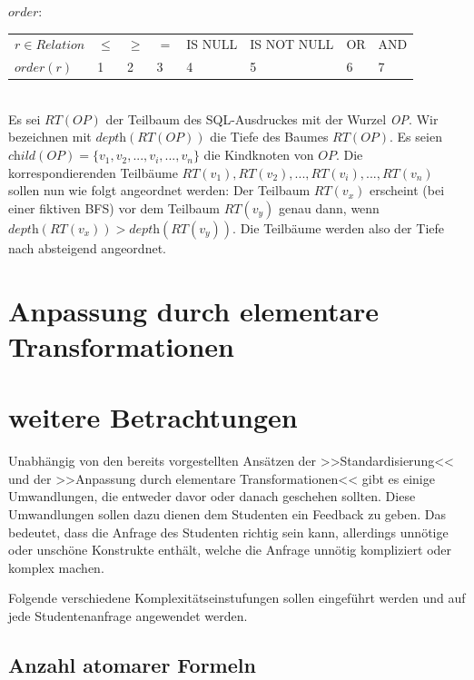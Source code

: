 $order:$\\

\begin{tabular}{|llllllll|}
\hline
$r\in \textit{Relation}$ & $\le$ & $\ge$ & $=$ & IS NULL & IS NOT NULL & OR & AND \\
$\textit{order}(r)$ & 1 & 2 & 3 & 4 & 5 & 6 & 7 \\
\hline
\end{tabular}\\

Es sei $\textit{RT}(\textit{OP})$ der Teilbaum des SQL-Ausdruckes mit der Wurzel \textit{OP}. Wir bezeichnen mit $\textit{depth}(\textit{RT}(\textit{OP}))$ die Tiefe des Baumes $\textit{RT}(\textit{OP})$. Es seien $\textit{child}(\textit{OP}) = \{v_1,v_2,...,v_i,...,v_n\}$ die Kindknoten von $\textit{OP}$. Die korrespondierenden Teilbäume $\textit{RT}(v_1),\textit{RT}(v_2),...,\textit{RT}(v_i),...,\textit{RT}(v_n)$ sollen nun wie folgt angeordnet werden: Der Teilbaum $\textit{RT}(v_x)$ erscheint (bei einer fiktiven BFS) vor dem Teilbaum $\textit{RT}(v_y)$ genau dann, wenn $\textit{depth}(\textit{RT}(v_x)) >  \textit{depth}(\textit{RT}(v_y))$. Die Teilbäume werden also der Tiefe nach absteigend angeordnet. 



\section{Anpassung durch elementare Transformationen}

\section{weitere Betrachtungen}

Unabhängig von den bereits vorgestellten Ansätzen der >>Standardisierung<< und der >>Anpassung durch elementare Transformationen<< gibt es einige Umwandlungen, die entweder davor oder danach geschehen sollten. Diese Umwandlungen sollen dazu dienen dem Studenten ein Feedback zu geben. Das bedeutet, dass die Anfrage des Studenten richtig sein kann, allerdings unnötige oder unschöne Konstrukte enthält, welche die Anfrage unnötig kompliziert oder komplex machen.

Folgende verschiedene Komplexitätseinstufungen sollen eingeführt werden und auf jede Studentenanfrage angewendet werden.

\subsection{Anzahl atomarer Formeln}

